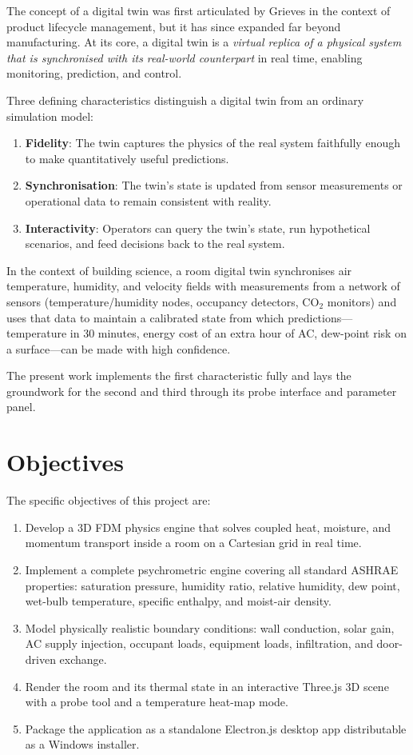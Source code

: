 \documentclass[12pt,a4paper]{report}
\begin{document}
The concept of a digital twin was first articulated by Grieves \cite{grieves2014} in the context of product lifecycle management, but it has since expanded far beyond manufacturing. At its core, a digital twin is a \textit{virtual replica of a physical system that is synchronised with its real-world counterpart} in real time, enabling monitoring, prediction, and control.

Three defining characteristics distinguish a digital twin from an ordinary simulation model:

\begin{enumerate}
  \item \textbf{Fidelity}: The twin captures the physics of the real system faithfully enough to make quantitatively useful predictions.
  \item \textbf{Synchronisation}: The twin's state is updated from sensor measurements or operational data to remain consistent with reality.
  \item \textbf{Interactivity}: Operators can query the twin's state, run hypothetical scenarios, and feed decisions back to the real system.
\end{enumerate}

In the context of building science, a room digital twin synchronises air temperature, humidity, and velocity fields with measurements from a network of sensors (temperature/humidity nodes, occupancy detectors, CO$_2$ monitors) and uses that data to maintain a calibrated state from which predictions---temperature in 30 minutes, energy cost of an extra hour of AC, dew-point risk on a surface---can be made with high confidence.

The present work implements the first characteristic fully and lays the groundwork for the second and third through its probe interface and parameter panel.

\section{Objectives}
\label{sec:objectives}

The specific objectives of this project are:

\begin{enumerate}
  \item Develop a 3D FDM physics engine that solves coupled heat, moisture, and momentum transport inside a room on a Cartesian grid in real time.
  \item Implement a complete psychrometric engine covering all standard ASHRAE properties: saturation pressure, humidity ratio, relative humidity, dew point, wet-bulb temperature, specific enthalpy, and moist-air density.
  \item Model physically realistic boundary conditions: wall conduction, solar gain, AC supply injection, occupant loads, equipment loads, infiltration, and door-driven exchange.
  \item Render the room and its thermal state in an interactive Three.js 3D scene with a probe tool and a temperature heat-map mode.
  \item Package the application as a standalone Electron.js desktop app distributable as a Windows installer.
\end{enumerate}
\end{document}

